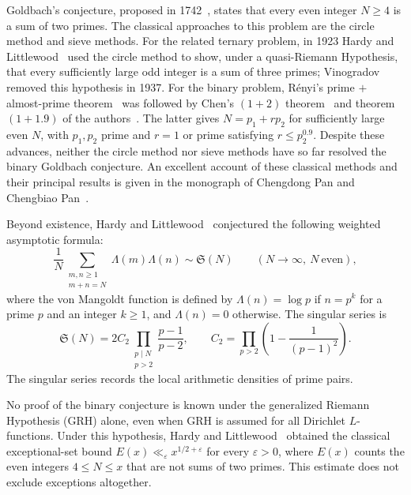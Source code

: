 \documentclass[12pt,a4paper]{amsart}
\numberwithin{equation}{section}
\def\le{\leqslant}
\def\ge{\geqslant}
\theoremstyle{plain}
\theoremstyle{definition}
\theoremstyle{remark}
\begin{document}
Goldbach's conjecture, proposed in 1742~\cite{GoldbachEuler1742},
states that every even integer
$N\ge4$ is a sum of two primes. The classical approaches to
this problem are the circle method and sieve methods.
For the related ternary problem, in 1923 Hardy and
Littlewood~\cite{HL23} used the circle method to show, under a
quasi-Riemann Hypothesis, that every sufficiently large odd
integer is a sum of three primes; Vinogradov~\cite{Vin37}
removed this hypothesis in 1937. For the binary problem, R\'enyi's prime $+$ almost-prime
theorem~\cite{Ren48} was followed by Chen's $(1+2)$ theorem~\cite{Chen6673}
and theorem $(1+1.9)$ of the authors~\cite{LiLiu19}.
The latter gives $N=p_1+r p_2$ for sufficiently
large even $N$, with $p_1, p_2$ prime and $r=1$ or prime satisfying
$r\le p_2^{0.9}$. Despite these advances, neither the circle
method nor sieve methods have so far resolved the binary
Goldbach conjecture. An excellent
account of these classical methods and their principal results
is given in the monograph of Chengdong Pan and Chengbiao
Pan~\cite{PanPan}.

Beyond existence, Hardy and Littlewood~\cite{HL23} conjectured
the following weighted asymptotic formula:
\begin{equation}\label{eq:hardy-littlewood-goldbach}
 \frac1N\sum_{\substack{m,n\ge1\\m+n=N}}
       \Lambda(m)\Lambda(n)\sim\mathfrak S(N)
 \qquad(N\to\infty,\ N\ \text{even}),
\end{equation}
where the von Mangoldt function is defined by $\Lambda(n)=\log p$
if $n=p^k$ for a prime $p$ and an
integer $k\ge1$, and $\Lambda(n)=0$ otherwise. The singular
series is
\begin{equation}\label{eq:singular-series}
 \mathfrak S(N)=2C_2\prod_{\substack{p\mid N\\p>2}}
                      \frac{p-1}{p-2},\qquad
 C_2=\prod_{p>2}\left(1-\frac1{(p-1)^2}\right).
\end{equation}
The singular series records the local arithmetic densities of
prime pairs.

No proof of the binary conjecture
is known under the generalized Riemann Hypothesis (GRH) alone,
even when GRH is assumed for all Dirichlet $L$-functions.
Under this hypothesis, Hardy and Littlewood~\cite{HL24V}
obtained the classical exceptional-set bound
$E(x)\ll_\varepsilon x^{1/2+\varepsilon}$ for every
$\varepsilon>0$, where $E(x)$ counts the even integers
$4\le N\le x$ that are not sums of two primes. This estimate
does not exclude exceptions altogether.
\end{document}
